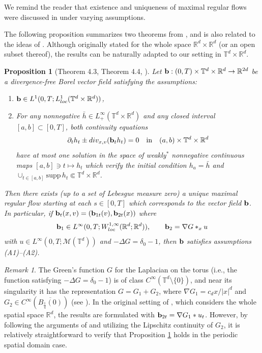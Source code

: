 \documentclass[11pt,reqno,a4paper]{amsart}
\newcommand{\R}{\mathbb{R}}
\newcommand{\p}{\partial}
\newtheorem{proposition}[lemma]{Proposition}
\theoremstyle{definition}
\theoremstyle{remark}
\newtheorem{remark}[lemma]{Remark}
\numberwithin{equation}{section}
\newcommand{\T} {\mathbb T}
\newcommand{\bfb}{{\bf b}}
\newcommand{\calM}{\mathcal M}
\begin{document}
We remind the reader that existence and uniqueness of maximal regular flows were discussed in \cite{ambrosiocolombofigalli2015, ambrosiocolombofigalli2017} under varying assumptions.

The following proposition summarizes two theorems from \cite{ambrosiocolombofigalli2017}, and is also related to the ideas of \cite{BBC16}. Although originally stated for the whole space $\R^d\times\R^d$ (or an open subset thereof), the results can be naturally adapted to our setting in $\T^d\times\R^d$.

\begin{proposition}[Theorem 4.3, Theorem 4.4, \cite{ambrosiocolombofigalli2017}] \label{prop: acf}
    Let $\bfb:(0,T)\times\T^d\times\R^d \to \R^{2d}$ be a divergence-free Borel vector field satisfying the assumptions:
    \begin{enumerate}
        \item[(A1)] $\bfb \in L^1(0,T;L^1_{loc}(\T^d\times\R^d))$, 
        \item[(A2)] For any nonnegative $\bar h\in L^\infty_+(\T^d\times\R^d)$ and any closed interval $[a,b] \subset [0,T]$, both continuity equations
        \begin{align*}
            \p_t h_t \pm \textnormal{div}_{x,v} (\bfb_t h_t) = 0 \quad \text{in} \quad  (a,b) \times \T^d\times\R^d
        \end{align*}
        have at most one solution in the space of weakly$^*$ nonnegative continuous maps $[a,b]\ni t\mapsto h_t$ which verify the initial condition $h_a = \bar h$ and $\cup_{t \in [a,b]} \text{supp}\, h_t \Subset \T^d\times \R^d$. 
    \end{enumerate}
    Then there exists (up to a set of Lebesgue measure zero) a unique maximal regular flow starting at each $s\in [0,T]$ which corresponds to the vector field $\bfb$. In particular, if $\bfb_t(x,v) = (\bfb_{1t}(v),\bfb_{2t}(x))$ where
    \begin{align*}
        \bfb_1\in L^\infty(0,T;W_{loc}^{1,\infty}(\R^d;\R^d)), \qquad \bfb_{2} = \nabla G *_{x} u
    \end{align*}
    with $u\in L^\infty(0,T;\calM(\T^d))$ and $-\Delta G = \delta_0 - 1$, then $\bfb$ satisfies assumptions (A1)--(A2).
\end{proposition}
\begin{remark}
    The Green's function $G$ for the Laplacian on the torus (i.e., the function satisfying $-\Delta G=\delta_0 -1$) is of class $C^\infty(\T^d\setminus\{0\})$, and near its singularity it has the representation $G=G_1+G_2$, where $\nabla G_1= c_d x/|x|^d$ and $G_2\in C^\infty(\overline{B_{\frac{1}{4}}(0)})$ (see \cite{titchmarsh1962}). In the original setting of \cite{ambrosiocolombofigalli2017}, which considers the whole spatial space $\R^d$, the results are formulated with $\bfb_{2t} = \nabla G_1 * u_t$. However, by following the arguments of \cite[Theorem 4.4]{ambrosiocolombofigalli2017} and utilizing the Lipschitz continuity of $G_2$, it is relatively straightforward to verify that Proposition \ref{prop: acf} holds in the periodic spatial domain case.
\end{remark}
\end{document}
